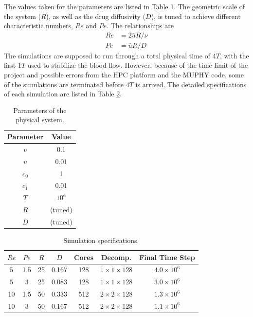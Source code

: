 The values taken for the parameters are listed in Table \ref{tab:para_physprop}. The geometric scale of the system ($R$), as well as the drug diffusivity ($D$), is tuned to achieve different characteristic numbers, $Re$ and $Pe$. The relationships are
\begin{align}
    Re&=2\bar{u}R/\nu \\
    Pe&=\bar{u}R/D
\end{align}
The simulations are supposed to run through a total physical time of $4T$, with the first $1T$ used to stabilize the blood flow. However, because of the time limit of the project and possible errors from the HPC platform and the MUPHY code, some of the simulations are terminated before $4T$ is arrived. The detailed specifications of each simulation are listed in Table \ref{tab:sim_spec}.
\begin{table}[htbp]
    \centering
    \begin{tabular}{cc}
        \toprule
        Parameter & Value \\
        \midrule
        $\nu$ & 0.1 \\
        $\bar{u}$ & 0.01 \\
        $c_0$ & 1 \\
        $c_1$ & 0.01 \\
        $T$ & $10^6$ \\
        $R$ & (tuned) \\
        $D$ & (tuned) \\
        \bottomrule
    \end{tabular}
    \caption{Parameters of the physical system.}
    \label{tab:para_physprop}
\end{table}

\begin{table}[htbp]
    \centering
    \begin{tabular}{cc|cc|ccc}
        \toprule
         $Re$ & $Pe$ & $R$ & $D$ & Cores & Decomp. & Final Time Step \\
        \hline
         5  & 1.5 & 25 & 0.167 & 128 & $1\times1\times128$ & $4.0\times10^6$ \\
         5  & 3   & 25 & 0.083 & 128 & $1\times1\times128$ & $3.0\times10^6$ \\
         10 & 1.5 & 50 & 0.333 & 512 & $2\times2\times128$ & $1.3\times10^6$ \\
         10 & 3   & 50 & 0.167 & 512 &
         $2\times2\times128$ & $1.1\times10^6$ \\
        \bottomrule
    \end{tabular}
    \caption{Simulation specifications. }
    \label{tab:sim_spec}
\end{table}